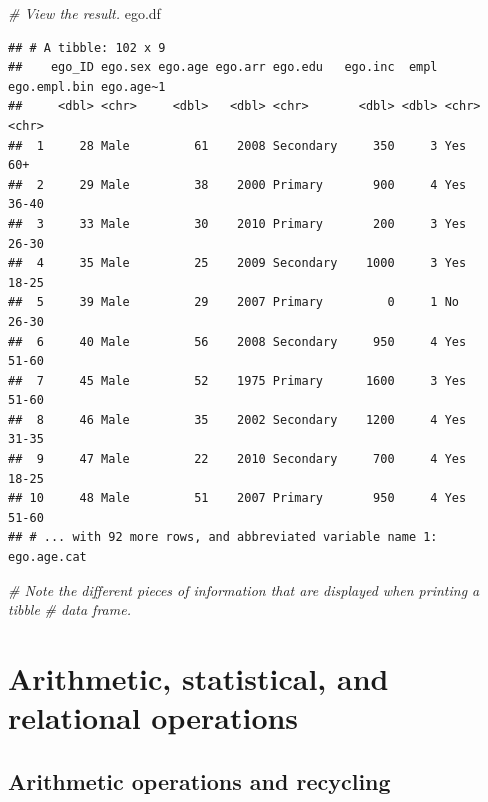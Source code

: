 \documentclass[
]{book}
\newenvironment{Shaded}{\begin{snugshade}}{\end{snugshade}}
\newcommand{\CommentTok}[1]{\textcolor[rgb]{0.56,0.35,0.01}{\textit{#1}}}
\newcommand{\NormalTok}[1]{#1}
\begin{document}
\begin{Shaded}
\begin{Highlighting}[]
\CommentTok{\# View the result.}
\NormalTok{ego.df}
\end{Highlighting}
\end{Shaded}

\begin{verbatim}
## # A tibble: 102 x 9
##    ego_ID ego.sex ego.age ego.arr ego.edu   ego.inc  empl ego.empl.bin ego.age~1
##     <dbl> <chr>     <dbl>   <dbl> <chr>       <dbl> <dbl> <chr>        <chr>    
##  1     28 Male         61    2008 Secondary     350     3 Yes          60+      
##  2     29 Male         38    2000 Primary       900     4 Yes          36-40    
##  3     33 Male         30    2010 Primary       200     3 Yes          26-30    
##  4     35 Male         25    2009 Secondary    1000     3 Yes          18-25    
##  5     39 Male         29    2007 Primary         0     1 No           26-30    
##  6     40 Male         56    2008 Secondary     950     4 Yes          51-60    
##  7     45 Male         52    1975 Primary      1600     3 Yes          51-60    
##  8     46 Male         35    2002 Secondary    1200     4 Yes          31-35    
##  9     47 Male         22    2010 Secondary     700     4 Yes          18-25    
## 10     48 Male         51    2007 Primary       950     4 Yes          51-60    
## # ... with 92 more rows, and abbreviated variable name 1: ego.age.cat
\end{verbatim}

\begin{Shaded}
\begin{Highlighting}[]
\CommentTok{\# Note the different pieces of information that are displayed when printing a tibble}
\CommentTok{\# data frame.}
\end{Highlighting}
\end{Shaded}

\hypertarget{arithmetic-statistical-and-relational-operations}{%
\section{Arithmetic, statistical, and relational operations}\label{arithmetic-statistical-and-relational-operations}}

\hypertarget{arithmetic-operations-and-recycling}{%
\subsection{Arithmetic operations and recycling}\label{arithmetic-operations-and-recycling}}
\end{document}
